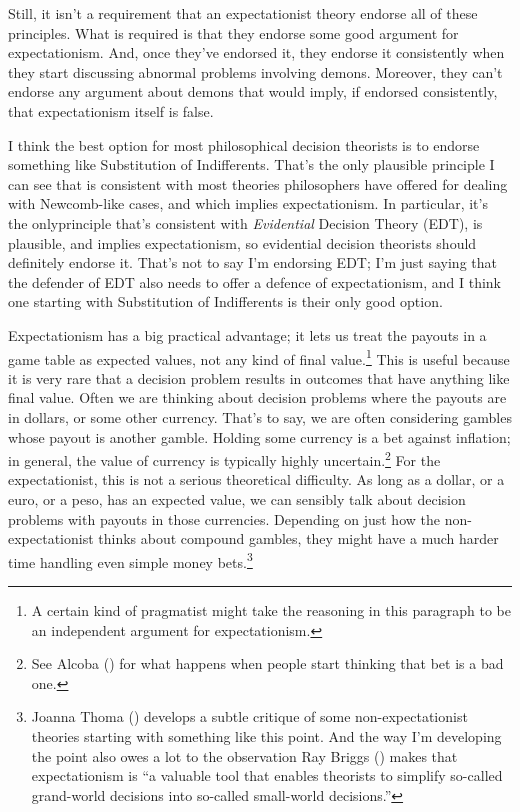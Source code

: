 \documentclass[
  12pt,
  letterpaper,
  DIV=11,
  numbers=noendperiod]{scrreprt}
\begin{document}
Still, it isn't a requirement that an expectationist theory endorse all
of these principles. What is required is that they endorse some good
argument for expectationism. And, once they've endorsed it, they endorse
it consistently when they start discussing abnormal problems involving
demons. Moreover, they can't endorse any argument about demons that
would imply, if endorsed consistently, that expectationism itself is
false.

I think the best option for most philosophical decision theorists is to
endorse something like Substitution of Indifferents. That's the only
plausible principle I can see that is consistent with most theories
philosophers have offered for dealing with Newcomb-like cases, and which
implies expectationism. In particular, it's the onlyprinciple that's
consistent with \emph{Evidential} Decision Theory (EDT), is plausible,
and implies expectationism, so evidential decision theorists should
definitely endorse it. That's not to say I'm endorsing EDT; I'm just
saying that the defender of EDT also needs to offer a defence of
expectationism, and I think one starting with Substitution of
Indifferents is their only good option.

Expectationism has a big practical advantage; it lets us treat the
payouts in a game table as expected values, not any kind of final
value.\footnote{A certain kind of pragmatist might take the reasoning in
  this paragraph to be an independent argument for expectationism.} This
is useful because it is very rare that a decision problem results in
outcomes that have anything like final value. Often we are thinking
about decision problems where the payouts are in dollars, or some other
currency. That's to say, we are often considering gambles whose payout
is another gamble. Holding some currency is a bet against inflation; in
general, the value of currency is typically highly uncertain.\footnote{See
  Alcoba () for what happens when people
  start thinking that bet is a bad one.} For the expectationist, this is
not a serious theoretical difficulty. As long as a dollar, or a euro, or
a peso, has an expected value, we can sensibly talk about decision
problems with payouts in those currencies. Depending on just how the
non-expectationist thinks about compound gambles, they might have a much
harder time handling even simple money bets.\footnote{Joanna Thoma
  () develops a subtle critique of some
  non-expectationist theories starting with something like this point.
  And the way I'm developing the point also owes a lot to the
  observation Ray Briggs () makes that
  expectationism is ``a valuable tool that enables theorists to simplify
  so-called grand-world decisions into so-called small-world
  decisions.''}
\end{document}
